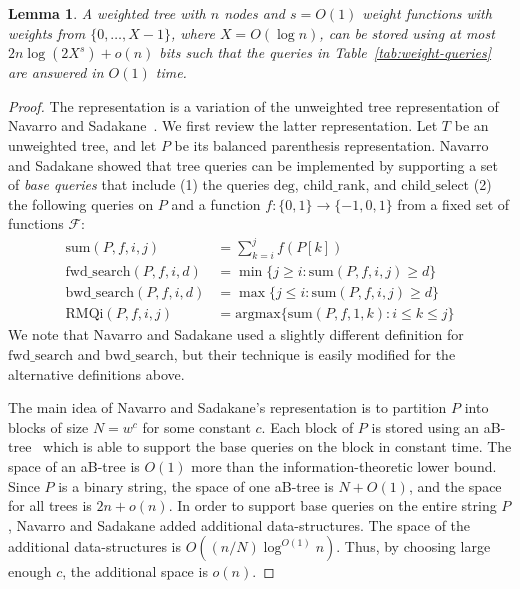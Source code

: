 \documentclass[12pt]{article}
\newtheorem{lemma}[theorem]{Lemma}
\newcommand{\Degb}{\mathrm{deg}}
\newcommand{\childrankb}{\mathrm{child\_rank}}
\newcommand{\childselectb}{\mathrm{child\_select}}
\newcommand{\Sumb}{\mathrm{sum}}
\newcommand{\fwdsearchb}{\mathrm{fwd\_search}}
\newcommand{\bwdsearchb}{\mathrm{bwd\_search}}
\newcommand{\RMQib}{\mathrm{RMQi}}
\newcommand{\Sum}[4]{\Sumb(#1,#2,#3,#4)}
\newcommand{\fwdsearch}[4]{\fwdsearchb(#1,#2,#3,#4)}
\newcommand{\bwdsearch}[4]{\bwdsearchb(#1,#2,#3,#4)}
\newcommand{\RMQi}[4]{\RMQib(#1,#2,#3,#4)}
\newcommand{\range}[2]{\{#1,\ldots,#2\}}
\begin{document}
\begin{lemma}\label{lem:weighted-tree}
A weighted tree with $n$ nodes and $s=O(1)$ weight functions with weights
from $\range{0}{X-1}$, where $X=O(\log n)$, can be stored using at most
$2n\log(2X^s)+o(n)$ bits such
that the queries in Table~\ref{tab:weight-queries} are answered
in $O(1)$ time.
\end{lemma}
\begin{proof}
The representation is a variation of the unweighted tree representation
of Navarro and Sadakane~\cite{NavarroS14}.
We first review the latter representation.
Let $T$ be an unweighted tree, and let $P$ be its balanced parenthesis
representation.
Navarro and Sadakane showed that tree queries can be implemented by
supporting a set of \emph{base queries} that include
(1) the queries $\Degb$, $\childrankb$, and $\childselectb$
(2) the following queries on $P$ and a function
$f:\{0,1\}\to \{-1,0,1\}$ from a fixed set of functions $\mathcal{F}$:
\begin{align*}
\Sum{P}{f}{i}{j} & =\sum_{k=i}^{j}f(P[k])\\
\fwdsearch{P}{f}{i}{d} & =\min\{j\geq i:\Sum{P}{f}{i}{j} \geq d\}\\
\bwdsearch{P}{f}{i}{d} & =\max\{j\leq i:\Sum{P}{f}{i}{j} \geq d\}\\
\RMQi{P}{f}{i}{j} & =\mathrm{argmax}\{\Sum{P}{f}{1}{k}:i\leq k\leq j\}
\end{align*}
We note that Navarro and Sadakane used a slightly different definition for
$\fwdsearchb$ and $\bwdsearchb$, but their technique is easily modified for the
alternative definitions above.

The main idea of Navarro and Sadakane's representation is to partition $P$
into blocks of size $N=w^c$ for some constant $c$.
Each block of $P$ is stored using an aB-tree~\cite{Patrascu08} which
is able to support the base queries on the block in constant time.
The space of an aB-tree is $O(1)$ more than the information-theoretic lower
bound.
Since $P$ is a binary string, the space of one aB-tree is $N+O(1)$,
and the space for all trees is $2n+o(n)$.
In order to support base queries on the entire string $P$,
Navarro and Sadakane added additional data-structures.
The space of the additional data-structures is $O((n/N)\log^{O(1)}n)$.
Thus, by choosing large enough $c$, the additional space is $o(n)$.


\end{proof}
\end{document}
